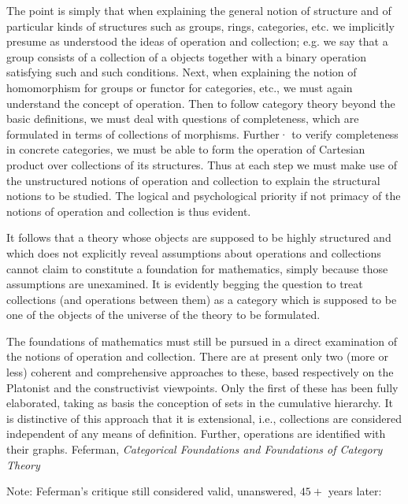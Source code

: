 \documentclass[11pt,openany]{book}
\begin{document}
\begin{boxquote}
The point is simply that when explaining the general notion of
structure and of particular kinds of structures such as groups, rings,
categories, etc. we implicitly presume as understood the ideas of
operation and collection; e.g. we say that a group consists of a collection
of a objects together with a binary operation satisfying such and
such conditions. Next, when explaining the notion of homomorphism
for groups or functor for categories, etc., we must again understand the
concept of operation. Then to follow category theory beyond the basic
definitions, we must deal with questions of completeness, which are
formulated in terms of collections of morphisms. Further· to verify
completeness in concrete categories, we must be able to form the
operation of Cartesian product over collections of its structures. Thus
at each step we must make use of the unstructured notions of operation
and collection to explain the structural notions to be studied. The
logical and psychological priority if not primacy of the notions of
operation and collection is thus evident.
\par
It follows that a theory whose objects are supposed to be highly
structured and which does not explicitly reveal assumptions about
operations and collections cannot claim to constitute a foundation for
mathematics, simply because those assumptions are unexamined. It is
evidently begging the question to treat collections (and operations
between them) as a category which is supposed to be one of the objects
of the universe of the theory to be formulated.
\par
The foundations of mathematics must still be pursued in a direct
examination of the notions of operation and collection. There are at
present only two (more or less) coherent and comprehensive approaches
to these, based respectively on the Platonist and the constructivist
viewpoints. Only the first of these has been fully elaborated,
taking as basis the conception of sets in the cumulative hierarchy. It is
distinctive of this approach that it is extensional, i.e., collections are
considered independent of any means of definition. Further, operations
are identified with their graphs.
\tcblower
{Feferman,
\emph{Categorical Foundations and Foundations of Category 
Theory}~\cite{Feferman:1977:CategoricalFoundations}}
\end{boxquote}

Note: Feferman's critique still considered valid, unanswered,
$45+$ years later:
\end{document}
